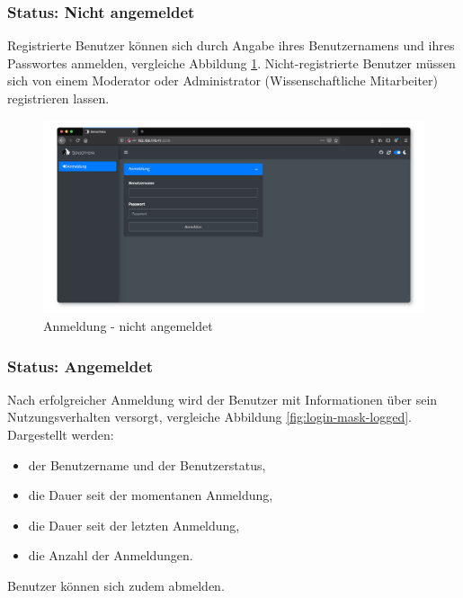 \documentclass[
]{article}
\providecommand{\tightlist}{%
  \setlength{\itemsep}{0pt}\setlength{\parskip}{0pt}}
\begin{document}
\hypertarget{status-nicht-angemeldet}{%
\subsubsection{Status: Nicht angemeldet}\label{status-nicht-angemeldet}}

Registrierte Benutzer können sich durch Angabe ihres Benutzernamens und ihres Passwortes anmelden, vergleiche Abbildung \ref{fig:login-mask}. Nicht-registrierte Benutzer müssen sich von einem Moderator oder Administrator (Wissenschaftliche Mitarbeiter) registrieren lassen.

\begin{figure}
\centering
\includegraphics{./img/login_mask.png}
\caption{\label{fig:login-mask}Anmeldung - nicht angemeldet}
\end{figure}

\hypertarget{status-angemeldet}{%
\subsubsection{Status: Angemeldet}\label{status-angemeldet}}

Nach erfolgreicher Anmeldung wird der Benutzer mit Informationen über sein Nutzungsverhalten versorgt, vergleiche Abbildung \ref{fig:login-mask-logged}. Dargestellt werden:

\begin{itemize}
\tightlist
\item
  der Benutzername und der Benutzerstatus,
\item
  die Dauer seit der momentanen Anmeldung,
\item
  die Dauer seit der letzten Anmeldung,
\item
  die Anzahl der Anmeldungen.
\end{itemize}

Benutzer können sich zudem abmelden.
\end{document}
